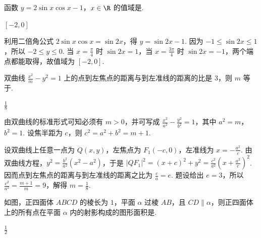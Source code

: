 \begin{problem}
函数 \(y = 2\sin x\cos x - 1\)，\(x \in \R\) 的值域是\fillinblank{}.
\end{problem}

\begin{answer}
\([-2,0]\)
\end{answer}

\begin{solution}
利用二倍角公式 \(2\sin x\cos x=\sin2x\)，得 \(y=\sin2x-1\). 因为 \(-1\leqslant\sin2x\leqslant1\)，所以 \(-2\leqslant y\leqslant0\). 当 \(x=\frac{\pi}{4}\) 时 \(\sin2x=1\)，当 \(x=\frac{3\pi}{4}\) 时 \(\sin2x=-1\)，两个端点都能取得，故值域为 \([-2,0]\).
\end{solution}

\begin{problem}
双曲线 \( \frac{x^{2}}{m}-y^{2}=1 \) 上的点到左焦点的距离与到左准线的距离的比是 \(3\)，则 \(m\) 等于\fillinblank{}.
\end{problem}

\begin{answer}
\(\frac{1}{8}\)
\end{answer}

\begin{solution}
由双曲线的标准形式可知必须有 \(m>0\)，并可写成 \(\frac{x^2}{a^2}-\frac{y^2}{b^2}=1\)，其中 \(a^2=m\)，\(b^2=1\). 设焦半距为 \(c\)，则 \(c^2=a^2+b^2=m+1\).

设双曲线上任意一点为 \(Q(x,y)\)，左焦点为 \(F_1(-c,0)\)，左准线为 \(x=-\frac{a^2}{c}\). 由双曲线方程，\(y^2=\frac{b^2}{a^2}(x^2-a^2)\)，于是
\(\lvert QF_1\rvert^2=(x+c)^2+y^2=\frac{c^2}{a^2}\left(x+\frac{a^2}{c}\right)^2\). 因而点到左焦点的距离与到左准线的距离之比为 \(\frac ca=e\). 题设给出 \(e=3\)，所以
\(\frac{c^2}{a^2}=\frac{m+1}{m}=9\)，解得 \(m=\frac18\).
\end{solution}

\begin{problem}
如图，正四面体 \(ABCD\) 的棱长为 \(1\)，平面 \(\alpha\) 过棱 \(AB\)，且 \(CD \parallel \alpha\)，则正四面体上的所有点在平面 \(\alpha\) 内的射影构成的图形面积是\fillinblank{}.

\end{problem}

\begin{answer}
\(\frac{1}{2}\)
\end{answer}

